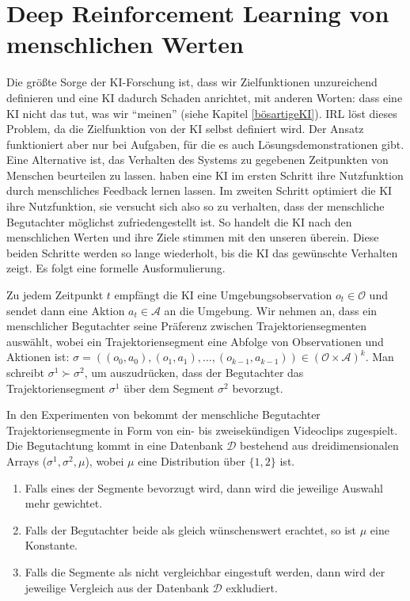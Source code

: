 \section{Deep Reinforcement Learning von menschlichen Werten}
Die größte Sorge der KI-Forschung ist, dass wir Zielfunktionen unzureichend definieren und eine KI dadurch Schaden anrichtet, mit anderen Worten: dass eine KI nicht das tut, was wir \enquote{meinen} (siehe Kapitel \ref{bösartigeKI}). IRL löst dieses Problem, da die Zielfunktion von der KI selbst definiert wird. Der Ansatz funktioniert aber nur bei Aufgaben, für die es auch Lösungsdemonstrationen gibt. Eine Alternative ist, das Verhalten des Systems zu gegebenen Zeitpunkten von Menschen beurteilen zu lassen. \citeauthor{christiano_deep_2017} haben eine KI im ersten Schritt ihre Nutzfunktion durch menschliches Feedback lernen lassen. Im zweiten Schritt optimiert die KI ihre Nutzfunktion, sie versucht sich also so zu verhalten, dass der menschliche Begutachter möglichst zufriedengestellt ist. So handelt die KI nach den menschlichen Werten und ihre Ziele stimmen mit den unseren überein. Diese beiden Schritte werden so lange wiederholt, bis die KI das gewünschte Verhalten zeigt.  Es folgt eine formelle Ausformulierung.

Zu jedem Zeitpunkt $t$ empfängt die KI eine Umgebungsobservation $o_t \in \mathcal{O}$ und sendet dann eine Aktion $a_t \in \mathcal{A}$ an die Umgebung. Wir nehmen an, dass ein menschlicher Begutachter seine Präferenz zwischen Trajektoriensegmenten auswählt, wobei ein Trajektoriensegment eine Abfolge von Observationen und Aktionen ist: $\sigma = ((o_0,a_0),(o_1,a_1),...,(o_{k-1},a_{k-1})) \in (\mathcal{O} \times \mathcal{A})^k$. Man schreibt $\sigma^1 \succ \sigma^2$, um auszudrücken, dass der Begutachter das Trajektoriensegment $\sigma^1$ über dem Segment $\sigma^2$ bevorzugt. 

In den Experimenten von \citeauthor{christiano_deep_2017} bekommt der menschliche Begutachter Trajektoriensegmente in Form von ein- bis zweisekündigen Videoclips zugespielt. Die Begutachtung kommt in eine Datenbank $\mathcal{D}$ bestehend aus dreidimensionalen Arrays ($\sigma^1,\sigma^2,\mu$), wobei $\mu$ eine Distribution über $\{1,2\}$ ist.

\begin{enumerate}
\item Falls eines der Segmente bevorzugt wird, dann wird die jeweilige Auswahl mehr gewichtet.
\item Falls der Begutachter beide als gleich wünschenswert erachtet, so ist $\mu$ eine Konstante.
\item Falls die Segmente als nicht vergleichbar eingestuft werden, dann wird der jeweilige Vergleich aus der Datenbank $\mathcal{D}$ exkludiert.
\end{enumerate}
  
